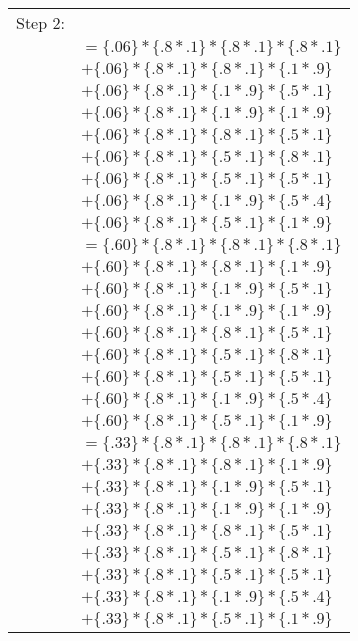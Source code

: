\documentclass[12pt]{article}
\begin{document}
\begin{tabular}{l l}
	Step 2: 	&	\\
			&	$ = \{.06\} * \{.8 * .1\} * \{.8 * .1\} * \{.8 * .1\} $\\ %
			&	$ + \{.06\} * \{.8 * .1\} * \{.8 * .1\} * \{.1 * .9\} $\\
			&	$ + \{.06\} * \{.8 * .1\} * \{.1 * .9\} * \{.5 * .1\} $\\
			&	$ + \{.06\} * \{.8 * .1\} * \{.1 * .9\} * \{.1 * .9\} $\\
			&	$ + \{.06\} * \{.8 * .1\} * \{.8 * .1\} * \{.5 * .1\} $\\
			&	$ + \{.06\} * \{.8 * .1\} * \{.5 * .1\} * \{.8 * .1\} $\\
			&	$ + \{.06\} * \{.8 * .1\} * \{.5 * .1\} * \{.5 * .1\} $\\
			&	$ + \{.06\} * \{.8 * .1\} * \{.1 * .9\} * \{.5 * .4\} $\\
			&	$ + \{.06\} * \{.8 * .1\} * \{.5 * .1\} * \{.1 * .9\} $\\
			&	$ = \{.60\} * \{.8 * .1\}  * \{.8 * .1\} * \{.8 * .1\} $\\ %
			&	$ + \{.60\} * \{.8 * .1\}  * \{.8 * .1\} * \{.1 * .9\} $\\
			&	$ + \{.60\} * \{.8 * .1\}  * \{.1 * .9\} * \{.5 * .1\} $\\
			&	$ + \{.60\} * \{.8 * .1\}  * \{.1 * .9\} * \{.1 * .9\} $\\
			&	$ + \{.60\} * \{.8 * .1\}  * \{.8 * .1\} * \{.5 * .1\} $\\
			&	$ + \{.60\} * \{.8 * .1\}  * \{.5 * .1\} * \{.8 * .1\} $\\
			&	$ + \{.60\} * \{.8 * .1\}  * \{.5 * .1\} * \{.5 * .1\} $\\
			&	$ + \{.60\} * \{.8 * .1\}  * \{.1 * .9\} * \{.5 * .4\} $\\
			&	$ + \{.60\} * \{.8 * .1\}  * \{.5 * .1\} * \{.1 * .9\} $\\
			&	$ = \{.33\} * \{.8 * .1\}  * \{.8 * .1\} * \{.8 * .1\} $\\ %
			&	$ + \{.33\} * \{.8 * .1\}  * \{.8 * .1\} * \{.1 * .9\} $\\
			&	$ + \{.33\} * \{.8 * .1\}  * \{.1 * .9\} * \{.5 * .1\} $\\
			&	$ + \{.33\} * \{.8 * .1\}  * \{.1 * .9\} * \{.1 * .9\} $\\
			&	$ + \{.33\} * \{.8 * .1\}  * \{.8 * .1\} * \{.5 * .1\} $\\
			&	$ + \{.33\} * \{.8 * .1\}  * \{.5 * .1\} * \{.8 * .1\} $\\
			&	$ + \{.33\} * \{.8 * .1\}  * \{.5 * .1\} * \{.5 * .1\} $\\
			&	$ + \{.33\} * \{.8 * .1\}  * \{.1 * .9\} * \{.5 * .4\} $\\
			&	$ + \{.33\} * \{.8 * .1\}  * \{.5 * .1\} * \{.1 * .9\} $\\
\end{tabular}
\end{document}
